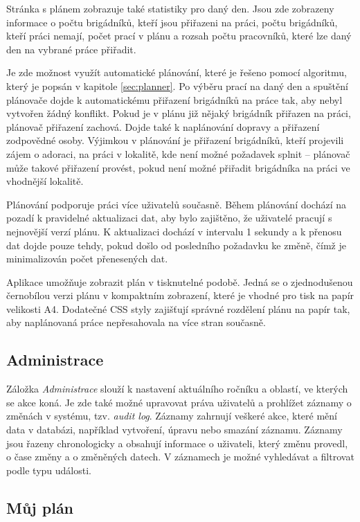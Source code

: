 Stránka s plánem zobrazuje také statistiky pro daný den. Jsou zde zobrazeny informace o počtu brigádníků, kteří jsou přiřazeni na práci, počtu brigádníků, kteří
práci nemají, počet prací v plánu a rozsah počtu pracovníků, které lze daný den na vybrané práce přiřadit.

Je zde možnost využít automatické plánování, které je řešeno pomocí algoritmu, který je popsán v kapitole \ref{sec:planner}. Po výběru prací na daný den a spuštění
plánovače dojde k automatickému přiřazení brigádníků na práce tak, aby nebyl vytvořen žádný konflikt. Pokud je v plánu již nějaký brigádník přiřazen na práci, 
plánovač přiřazení zachová. Dojde také k naplánování dopravy a přiřazení zodpovědné osoby. Výjimkou v plánování je přiřazení brigádníků, kteří projevili zájem o adoraci,
na práci v lokalitě, kde není možné požadavek splnit -- plánovač může takové přiřazení provést, pokud není možné přiřadit brigádníka na práci ve vhodnější lokalitě.

Plánování podporuje práci více uživatelů současně. Během plánování dochází na pozadí k pravidelné aktualizaci dat, aby bylo zajištěno,
že uživatelé pracují s nejnovější verzí plánu. K aktualizaci dochází v intervalu 1 sekundy a k přenosu dat dojde pouze tehdy, pokud došlo od posledního požadavku ke změně,
čímž je minimalizován počet přenesených dat.

Aplikace umožňuje zobrazit plán v tisknutelné podobě. Jedná se o zjednodušenou černobílou verzi plánu v kompaktním zobrazení, které je vhodné pro tisk na 
papír velikosti A4. Dodatečné CSS styly zajišťují správné rozdělení plánu na papír tak, aby naplánovaná práce nepřesahovala na více stran současně.

\subsection{Administrace}

Záložka \textit{Administrace} slouží k nastavení aktuálního ročníku a oblastí, ve kterých se akce koná. Je zde také možné upravovat
práva uživatelů a prohlížet záznamy o změnách v systému, tzv. \textit{audit log}. Záznamy zahrnují veškeré akce, které mění data v databázi,
například vytvoření, úpravu nebo smazání záznamu. Záznamy jsou řazeny chronologicky a obsahují informace o uživateli, který změnu provedl,
o čase změny a o změněných datech. V záznamech je možné vyhledávat a filtrovat podle typu události.

\subsection{Můj plán}


